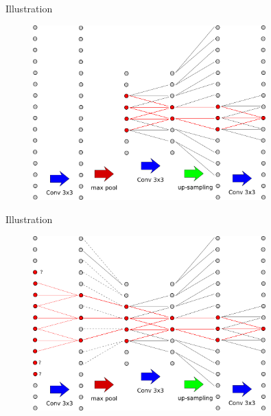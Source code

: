 \documentclass[xcolor=pdftex,dvipsnames,table,mathserif]{beamer}
\begin{document}
\begin{frame}{Illustration}

  \begin{figure}
  \includegraphics[width=0.8\textwidth]{receptive_field2.png}
  \end{figure}

\end{frame}

\begin{frame}{Illustration}

  \begin{figure}
  \includegraphics[width=0.8\textwidth]{receptive_field3.png}
  \end{figure}

\end{frame}
\end{document}
